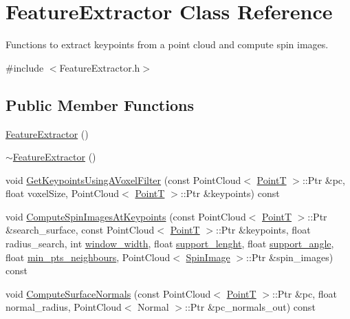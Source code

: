 \hypertarget{class_feature_extractor}{}\section{Feature\+Extractor Class Reference}
\label{class_feature_extractor}


Functions to extract keypoints from a point cloud and compute spin images.  




{\ttfamily \#include $<$Feature\+Extractor.\+h$>$}

\subsection*{Public Member Functions}
\begin{DoxyCompactItemize}
\item 
\hyperlink{class_feature_extractor_a58c705d663551bfa7baea3d75614311f}{Feature\+Extractor} ()
\item 
\hyperlink{class_feature_extractor_ad87b36879a01dcfe45f57318d2850c54}{$\sim$\+Feature\+Extractor} ()
\item 
void \hyperlink{class_feature_extractor_aa9dc5acc77de1af1f320c131a81a0928}{Get\+Keypoints\+Using\+A\+Voxel\+Filter} (const Point\+Cloud$<$ \hyperlink{include_8h_a6ca7710b84e9152e036423253ffc1ae7}{PointT} $>$\+::Ptr \&pc, float voxel\+Size, Point\+Cloud$<$ \hyperlink{include_8h_a6ca7710b84e9152e036423253ffc1ae7}{PointT} $>$\+::Ptr \&keypoints) const
\item 
void \hyperlink{class_feature_extractor_ad977ae7b163c09dd44b488c80a0a201c}{Compute\+Spin\+Images\+At\+Keypoints} (const Point\+Cloud$<$ \hyperlink{include_8h_a6ca7710b84e9152e036423253ffc1ae7}{PointT} $>$\+::Ptr \&search\+\_\+surface, const Point\+Cloud$<$ \hyperlink{include_8h_a6ca7710b84e9152e036423253ffc1ae7}{PointT} $>$\+::Ptr \&keypoints, float radius\+\_\+search, int \hyperlink{pcd__read_8cpp_a0e2e740afd510cfe652a1836ffbad209}{window\+\_\+width}, float \hyperlink{pcd__read_8cpp_abed5c1c3716fc66df9f1a01a430aa8cc}{support\+\_\+lenght}, float \hyperlink{pcd__read_8cpp_a13fd0ebf6c809f68d2b0e9bfc16bf68d}{support\+\_\+angle}, float \hyperlink{pcd__read_8cpp_abbd3dac675fcfc5a5b1d4650518f3771}{min\+\_\+pts\+\_\+neighbours}, Point\+Cloud$<$ \hyperlink{include_8h_ab79ade12a22a8e5e2864650f820e9c6f}{Spin\+Image} $>$\+::Ptr \&spin\+\_\+images) const
\item 
void \hyperlink{class_feature_extractor_a7612f1c3b17030d24a89b44973fd109e}{Compute\+Surface\+Normals} (const Point\+Cloud$<$ \hyperlink{include_8h_a6ca7710b84e9152e036423253ffc1ae7}{PointT} $>$\+::Ptr \&pc, float normal\+\_\+radius, Point\+Cloud$<$ Normal $>$\+::Ptr \&pc\+\_\+normals\+\_\+out) const
\end{DoxyCompactItemize}


